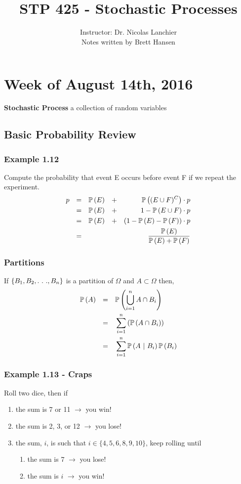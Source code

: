 \documentclass{article}
\title{STP 425 - Stochastic Processes}
\author{
{\Large Instructor: Dr. Nicolas Lanchier} \\
		Notes written by Brett Hansen
}
\date{}
\begin{document}
\maketitle
\tableofcontents
\break

\section{Week of August 14th, 2016}

\textbf{Stochastic Process} \quad a collection of random variables

\subsection{Basic Probability Review}
\subsubsection{Example 1.12}
Compute the probability that event E occurs before event F if we repeat the experiment.
\begin{align*}
p &&= &&\mathbb{P}\left(E\right) &&+ &&\mathbb{P}\left((E \cup F)^C\right) \cdot p \\
  &&= &&\mathbb{P}\left(E\right) &&+ &&1 - \mathbb{P}\left(E \cup F\right) \cdot p \\
  &&= &&\mathbb{P}\left(E\right) &&+ &&(1 - \mathbb{P}\left(E\right) - \mathbb{P}\left(F\right)) \cdot p \\
  &&= &&&&&&\frac{\mathbb{P}\left(E\right)}{\mathbb{P}\left(E\right) + \mathbb{P}\left(F\right)}
\end{align*}

\subsubsection{Partitions}
If $\{B_1, B_2, .\ .\ ., B_n\}$ is a partition of $\Omega$ and $A \subset \Omega$ then,
\begin{align*}
\mathbb{P}\left(A\right) 	&&= &&&\mathbb{P}\left(\bigcup_{i=1}^n A \cap B_i\right) \\
			&&= &&&\sum_{i=1}^n \left(\mathbb{P}\left(A \cap B_i\right)\right) \\
			&&= &&&\sum_{i=1}^n \mathbb{P}\left(A\ |\  B_i\right)\mathbb{P}\left(B_i\right)
\end{align*}

\subsubsection{Example 1.13 - Craps}
Roll two dice, then if
\begin{enumerate}
	\item the sum is 7 or 11 $\longrightarrow$ you win!
	\item the sum is 2, 3, or 12 $\longrightarrow$ you lose!
	\item the sum, $i$, is such that $i \in \{4, 5, 6, 8, 9, 10\}$, keep rolling until
	\begin{enumerate}
		\item the sum is 7 $\longrightarrow$ you lose!
		\item the sum is $i$ $\longrightarrow$ you win!
	\end{enumerate}
\end{enumerate}
\end{document}
